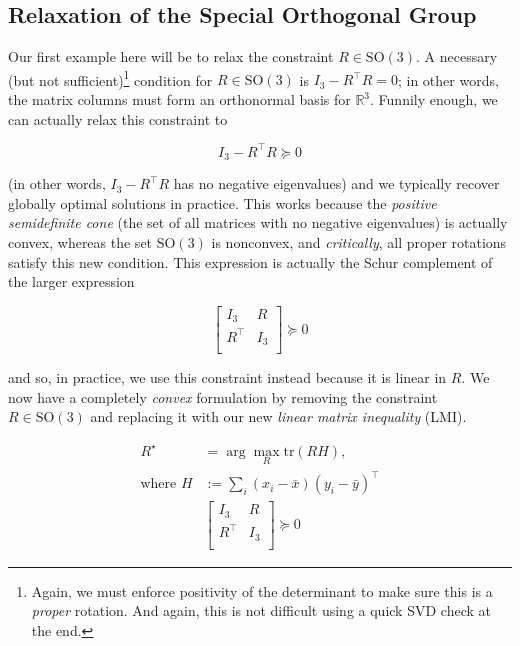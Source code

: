 \documentclass[conference]{IEEEtran}
\begin{document}
\subsection{Relaxation of the Special Orthogonal Group}

Our first example here will be to relax the constraint \( R \in \mathrm{SO(3)} \).  A necessary (but not sufficient)\footnote{Again, we must enforce positivity of the determinant to make sure this is a \textit{proper} rotation.  And again, this is not difficult using a quick SVD check at the end.} condition for \( R \in \mathrm{SO(3)} \) is \( I_3 - R^\top R = 0 \); in other words, the matrix columns must form an orthonormal basis for \( \mathbb{R}^3 \).  Funnily enough, we can actually relax this constraint to

\begin{equation}
	I_3 - R^\top R \succeq 0
\end{equation}

(in other words, \( I_3 - R^\top R \) has no negative eigenvalues) and we typically recover globally optimal solutions in practice.  This works because the \textit{positive semidefinite cone} (the set of all matrices with no negative eigenvalues) is actually convex, whereas the set \( \mathrm{SO(3)} \) is nonconvex, and \textit{critically}, all proper rotations satisfy this new condition.  This expression is actually the Schur complement of the larger expression

\begin{equation}
	\begin{bmatrix}
		I_3 & R \\
		R^\top & I_3 \\
	\end{bmatrix} \succeq 0
\end{equation}

and so, in practice, we use this constraint instead because it is linear in \( R \).  We now have a completely \textit{convex} formulation by removing the constraint \( R \in \mathrm{SO(3)} \) and replacing it with our new \textit{linear matrix inequality} (LMI).

\begin{align}
	R^\star &= \arg\max_{R} \mathrm{tr}( RH ), \\
	\text{where } H &:= \sum_i (x_i - \bar{x}) (y_i - \bar{y})^\top \\
	& \begin{bmatrix}
		I_3 & R \\
		R^\top & I_3 \\
	\end{bmatrix} \succeq 0
\end{align}
\end{document}
